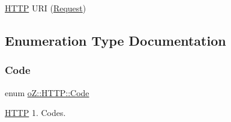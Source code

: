 \mbox{\hyperlink{namespaceo_z_1_1_h_t_t_p}{H\+T\+TP}} U\+RI (\mbox{\hyperlink{classo_z_1_1_h_t_t_p_1_1_request}{Request}}) 



\subsection{Enumeration Type Documentation}
\mbox{\label{namespaceo_z_1_1_h_t_t_p_acd43703151305f79b1e2f42e98ee8199}} 
\subsubsection{\texorpdfstring{Code}{Code}}
{\footnotesize\ttfamily enum \mbox{\hyperlink{namespaceo_z_1_1_h_t_t_p_acd43703151305f79b1e2f42e98ee8199}{o\+Z\+::\+H\+T\+T\+P\+::\+Code}}\hspace{0.3cm}{\ttfamily [strong]}}



\mbox{\hyperlink{namespaceo_z_1_1_h_t_t_p}{H\+T\+TP}} 1. Codes. 

